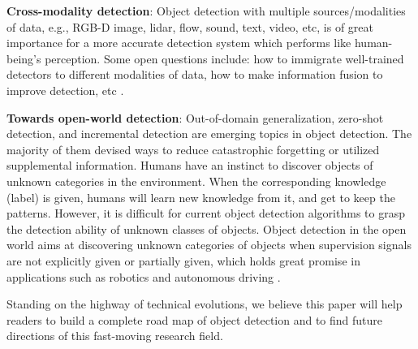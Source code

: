 \documentclass[lettersize,journal]{IEEEtran}
\begin{document}
\textbf{Cross-modality detection}: Object detection with multiple sources/modalities of data, e.g., RGB-D image, lidar, flow, sound, text, video, etc, is of great importance for a more accurate detection system which performs like human-being's perception. Some open questions include: how to immigrate well-trained detectors to different modalities of data, how to make information fusion to improve detection, etc \cite{cong2022cir, wang2022cross}.


\textbf{Towards open-world detection}: Out-of-domain generalization, zero-shot detection, and incremental detection are emerging topics in object detection. The majority of them devised ways to reduce catastrophic forgetting or utilized supplemental information. Humans have an instinct to discover objects of unknown categories in the environment. When the corresponding knowledge (label) is given, humans will learn new knowledge from it, and get to keep the patterns. However, it is difficult for current object detection algorithms to grasp the detection ability of unknown classes of objects. Object detection in the open world aims at discovering unknown categories of objects when supervision signals are not explicitly given or partially given, which holds great promise in applications such as robotics and autonomous driving \cite{feng2022promptdet, zhong2022regionclip}.



Standing on the highway of technical evolutions, we believe this paper will help readers to build a complete road map of object detection and to find future directions of this fast-moving research field.






\end{document}
